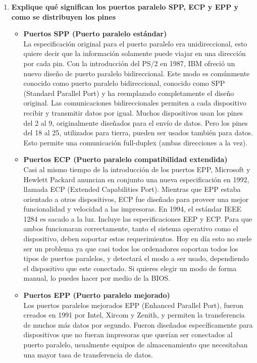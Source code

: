 \documentclass[a4paper,12pt]{article}
\begin{document}
\begin{enumerate}
  \item \textbf{Explique qué significan los puertos paralelo SPP, ECP y EPP y como se distribuyen los pines}
  
  \begin{itemize}
   \item \textbf{Puertos SPP (Puerto paralelo estándar)}\\
   La especificación original para el puerto paralelo era unidireccional, esto quiere decir que la información solamente puede viajar en una dirección por cada pin. Con la introducción del PS/2 en 1987, IBM ofreció un nuevo diseño de puerto paralelo bidireccional. Este modo es comúnmente conocido como puerto paralelo bidireccional, conocido como SPP (Standard Parallel Port) y ha reemplazado completamente el diseño original.
   Las comunicaciones bidireccionales permiten a cada dispositivo recibir y transmitir datos por igual. Muchos dispositivos usan los pines del 2 al 9, originalmente diseñados para el envío de datos. Pero los pines del 18 al 25, utilizados para tierra, pueden ser usados también para datos. Esto permite una comunicación full-duplex (ambas direcciones a la vez).
   \item \textbf{Puertos ECP (Puerto paralelo compatibilidad extendida)} \\
   Casi al mismo tiempo de la introducción de los puertos EPP, Microsoft y Hewlett Packard anuncian en conjunto una nueva especificación en 1992, llamada ECP (Extended Capabilities Port). Mientras que EPP estaba orientado a otros dispositivos, ECP fue diseñado para proveer una mejor funcionalidad y velocidad a las impresoras.
   En 1994, el estándar IEEE 1284 es sacado a la luz. Incluye las especificaciones EEP y ECP. Para que ambos funcionaran correctamente, tanto el sistema operativo como el dispositivo, deben soportar estos requerimientos. Hoy en día esto no suele ser un problema ya que casi todos los ordenadores soportan todos los tipos de puertos paralelos, y detectará el modo a ser usado, dependiendo el dispositivo que este conectado. Si quieres elegir un modo de forma manual, lo puedes hacer por medio de la BIOS.
   \item \textbf{Puertos EPP (Puerto paralelo mejorado)} \\
   Los puertos paralelos mejorados EPP (Enhanced Parallel Port), fueron creados en 1991 por Intel, Xircom y Zenith, y permiten la transferencia de muchos más datos por segundo. Fueron diseñados específicamente para dispositivos que no fueran impresoras que querían ser conectados al puerto paralelo, usualmente equipos de almacenamiento que necesitaban una mayor tasa de transferencia de datos.

\end{itemize}
\end{enumerate}
\end{document}
